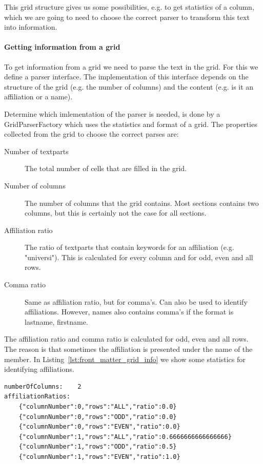 \documentclass{ou-report}
\begin{document}
This grid structure gives us some possibilities, e.g. to get statistics of a
column, which we are going to need to choose the correct parser to transform
this text into information.

\paragraph{Getting information from a grid}
\label{subsec:front_matter_grid_information}
To get information from a grid we need to parse the text in the grid. For 
this we define a parser interface. The implementation of this interface 
depends on the structure of the grid (e.g. the number of columns) and the 
content (e.g. is it an affiliation or a name).

\newpage
Determine which imlementation of the parser is needed, is done by a 
GridParserFactory which uses the statistics and format of a grid. The 
properties collected from the grid to choose the correct parses are:
\begin{description}
    \item[Number of textparts] The total number of cells that are filled in
        the grid.
    \item[Number of columns] The number of columns that the grid contains.
        Most sections contains two columns, but this is certainly not the 
        case for all sections.
    \item[Affiliation ratio] The ratio of textparts that contain keywords 
        for an affiliation (e.g. "universi"). This is calculated for every 
        column and for odd, even and all rows.
    \item[Comma ratio] Same as affiliation ratio, but for comma's. Can also
        be used to identify affiliations. However, names also contains 
        comma's if the format is lastname, firstname.
\end{description}

The affiliation ratio and comma ratio is calculated for odd, even and all
rows. The reason is that sometimes the affiliation is presented under the
name of the member. In Listing~\ref{lst:front_matter_grid_info} we show 
some statistics for identifying affiliations.

\begin{lstlisting}[caption={Some derived information from the grid},captionpos=b,label={lst:front_matter_grid_info}]
numberOfColumns:	2
affiliationRatios:
	{"columnNumber":0,"rows":"ALL","ratio":0.0}
	{"columnNumber":0,"rows":"ODD","ratio":0.0}
	{"columnNumber":0,"rows":"EVEN","ratio":0.0}
	{"columnNumber":1,"rows":"ALL","ratio":0.6666666666666666}
	{"columnNumber":1,"rows":"ODD","ratio":0.5}
	{"columnNumber":1,"rows":"EVEN","ratio":1.0}
\end{lstlisting}
\end{document}

